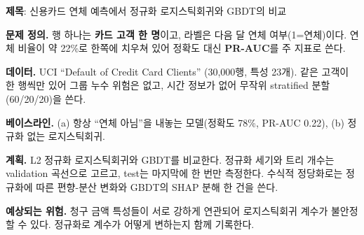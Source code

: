 \documentclass[11pt]{article}
\begin{document}


\noindent\textbf{제목}: 신용카드 연체 예측에서 정규화 로지스틱회귀와 GBDT의 비교

\vspace{4pt}
\noindent\textbf{문제 정의.} 행 하나는 \textbf{카드 고객 한 명}이고, 라벨은 다음 달 연체 여부(1=연체)이다. 연체 비율이 약 22\%로 한쪽에 치우쳐 있어 정확도 대신 \textbf{PR-AUC}를 주 지표로 쓴다.

\noindent\textbf{데이터.} UCI ``Default of Credit Card Clients'' (30{,}000행, 특성 23개). 같은 고객이 한 행씩만 있어 그룹 누수 위험은 없고, 시간 정보가 없어 무작위 stratified 분할(60/20/20)을 쓴다.

\noindent\textbf{베이스라인.} (a) 항상 ``연체 아님''을 내놓는 모델(정확도 78\%, PR-AUC 0.22), (b) 정규화 없는 로지스틱회귀.

\noindent\textbf{계획.} L2 정규화 로지스틱회귀와 GBDT를 비교한다. 정규화 세기와 트리 개수는 validation 곡선으로 고르고, test는 마지막에 한 번만 측정한다. 수식적 정당화로는 정규화에 따른 편향-분산 변화와 GBDT의 SHAP 분해 한 건을 쓴다.

\noindent\textbf{예상되는 위험.} 청구 금액 특성들이 서로 강하게 연관되어 로지스틱회귀 계수가 불안정할 수 있다. 정규화로 계수가 어떻게 변하는지 함께 기록한다.
\end{document}
